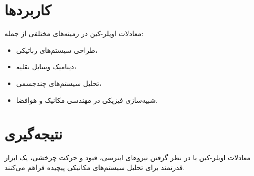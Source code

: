 \section*{کاربردها}
معادلات اویلر-کین در زمینه‌های مختلفی از جمله:
\begin{itemize}
	\item طراحی سیستم‌های رباتیکی،
	\item دینامیک وسایل نقلیه،
	\item تحلیل سیستم‌های چندجسمی،
	\item شبیه‌سازی فیزیکی در مهندسی مکانیک و هوافضا.
\end{itemize}

\section*{نتیجه‌گیری}
معادلات اویلر-کین با در نظر گرفتن نیروهای اینرسی، قیود و حرکت چرخشی، یک ابزار قدرتمند برای تحلیل سیستم‌های مکانیکی پیچیده فراهم می‌کنند.
